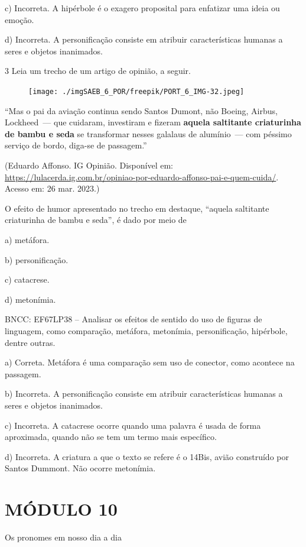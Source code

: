 c) Incorreta. A hipérbole é o exagero proposital para enfatizar uma
ideia ou emoção.

d) Incorreta. A personificação consiste em atribuir características
humanas a seres e objetos inanimados.

\num{3} Leia um trecho de um artigo de opinião, a seguir.

\begin{figure}
\texttt{[image: ./imgSAEB\_6\_POR/freepik/PORT\_6\_IMG-32.jpeg]}
\end{figure}

``Mas o pai da aviação continua sendo Santos Dumont, não Boeing, Airbus,
Lockheed~--- que cuidaram, investiram e fizeram \textbf{aquela
saltitante criaturinha de bambu e seda} se transformar nesses galalaus
de alumínio~--- com péssimo serviço de bordo, diga-se de passagem.''

(Eduardo Affonso. IG Opinião. Disponível em: 
\url{https://lulacerda.ig.com.br/opiniao-por-eduardo-affonso-pai-e-quem-cuida/}.
Acesso em: 26 mar. 2023.)

O efeito de humor apresentado no trecho em destaque, ``aquela saltitante
criaturinha de bambu e seda'', é dado por meio de

a) metáfora.

b) personificação.

c) catacrese.

d) metonímia.

BNCC: EF67LP38 -- Analisar os efeitos de sentido do uso de figuras de
linguagem, como comparação, metáfora, metonímia, personificação,
hipérbole, dentre outras.

a) Correta. Metáfora é uma comparação sem uso de conector, como acontece
na passagem.

b) Incorreta. A personificação consiste em atribuir características
humanas a seres e objetos inanimados.

c) Incorreta. A catacrese ocorre quando uma palavra é usada de forma
aproximada, quando não se tem um termo mais específico.

d) Incorreta. A criatura a que o texto se refere é o 14Bis, avião
construído por Santos Dummont. Não ocorre metonímia.


\section{MÓDULO 10}

Os pronomes em nosso dia a dia

